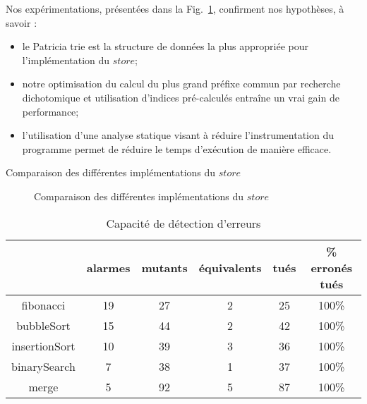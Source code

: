 Nos expérimentations, présentées dans la Fig.~\ref{fig:mmodel-exp}, confirment
nos hypothèses, à savoir :
\begin{itemize}
\item le Patricia trie est la structure de données la plus appropriée pour
  l'implémentation du $store$;
\item notre optimisation du calcul du plus grand préfixe commun par recherche
  dichotomique et utilisation d'indices pré-calculés entraîne un vrai gain de
  performance;
\item l'utilisation d'une analyse statique visant à réduire l'instrumentation
  du programme permet de réduire le temps d'exécution de manière efficace.
\end{itemize}


\begin{landscape}
  \begin{table}[h]
    \centering
    \begin{footnotesize}
    
    \end{footnotesize}
    \label{tab:mmodel-exp}
    \caption{Comparaison des différentes implémentations du $store$}
  \end{table}
\end{landscape}


\begin{figure}[bt]
  \label{fig:mmodel-exp}
  \caption{Comparaison des différentes implémentations du $store$}
\end{figure}


\begin{table}[tb]
  \centering
  \begin{tabular}{c|c|c|c|c|c}
    & alarmes & mutants & équivalents & tués & \% erronés tués \\
    \hline
    fibonacci & 19  & 27 & 2 & 25 & 100\% \\
    \hline
    bubbleSort & 15  & 44 & 2 & 42 & 100\% \\
    \hline
    insertionSort & 10  & 39 & 3 & 36 & 100\% \\
    \hline
    binarySearch & 7 & 38 & 1 & 37 & 100\% \\
    \hline
    merge & 5 & 92 & 5 & 87 & 100\% \\
  \end{tabular}
  \label{tab:mutation-exp}
  \caption{Capacité de détection d'erreurs}
\end{table}
